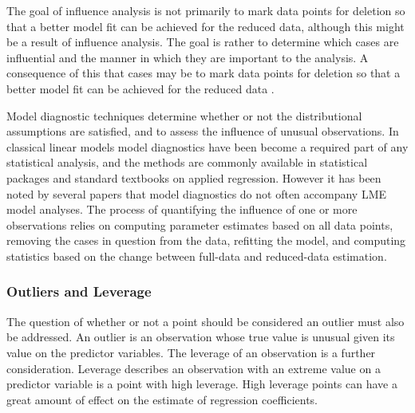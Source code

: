 \documentclass[12pt, a4paper]{report}
\theoremstyle{plain}
\theoremstyle{definition}
\theoremstyle{remark}
\begin{document}
	The goal of influence analysis is not primarily to mark data
	points for deletion so that a better model fit can be achieved for the reduced data, although this might be a
	result of influence analysis. The goal is rather to determine which cases are influential and the manner in
	which they are important to the analysis. A consequence of this that cases may be to mark data points for deletion so that a better model fit can be achieved for the reduced data \citep{schabenberger}.
	
	Model diagnostic techniques determine whether or not the distributional assumptions are satisfied, and to assess the influence of unusual observations. In classical linear models model diagnostics have been become a required part of any statistical analysis, and the methods are commonly available in statistical packages and standard textbooks on applied regression. However it has been noted by several papers that model diagnostics do not often accompany LME model analyses.
	The process of quantifying the influence of one or more observations relies on computing parameter estimates based on all data points, removing the cases in question from the data, refitting the model, and computing statistics based on the change between full-data and reduced-data estimation.
	
	
	
	
	
	

	\subsubsection{Outliers and Leverage}
	
	
	
	The question of whether or not a point should be considered an outlier must also be addressed. An outlier is an observation whose true value is unusual given its value on the predictor variables. The leverage of an observation is a further consideration. Leverage describes an observation with an extreme value on a predictor variable is a point with high leverage. High leverage points can have a great amount of effect on the estimate of regression coefficients.
	
	
\end{document}
